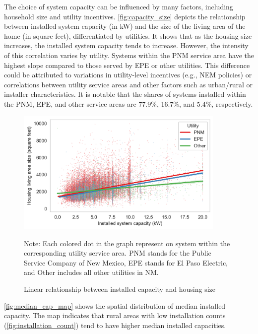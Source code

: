 \documentclass[12pt,twoside,letterpaper]{article}
\begin{document}
The choice of system capacity can be influenced by many factors, including household size and utility incentives. \autoref{fig:capacity_size} depicts the relationship between installed system capacity (in kW) and the size of the living area of the home (in square feet), differentiated by utilities. It shows that as the housing size increases, the installed system capacity tends to increase. However, the intensity of this correlation varies by utility. Systems within the PNM service area have the highest slope compared to those served by EPE or other utilities. This difference could be attributed to variations in utility-level incentives (e.g., NEM policies) or correlations between utility service areas and other factors such as urban/rural or installer characteristics. It is notable that the shares of systems installed within the PNM, EPE, and other service areas are 77.9\%, 16.7\%, and 5.4\%, respectively.
 
\begin{figure}[!ht]
    \centering
\includegraphics[width=0.9\textwidth]{figures/capacity_house_size.png}
    \caption{Linear relationship between installed capacity and housing size}
    \label{fig:capacity_size}
        \begin{flushleft}
        \footnotesize Note: Each colored dot in the graph represent on system within the corresponding utility service area. PNM stands for the Public Service Company of New Mexico, EPE stands for El Paso Electric, and Other includes all other utilities in NM.
    \end{flushleft}
\end{figure}

\autoref{fig:median_cap_map} shows the spatial distribution of median installed capacity. The map indicates that rural areas with low installation counts (\autoref{fig:installation_count}) tend to have higher median installed capacities.
\end{document}

